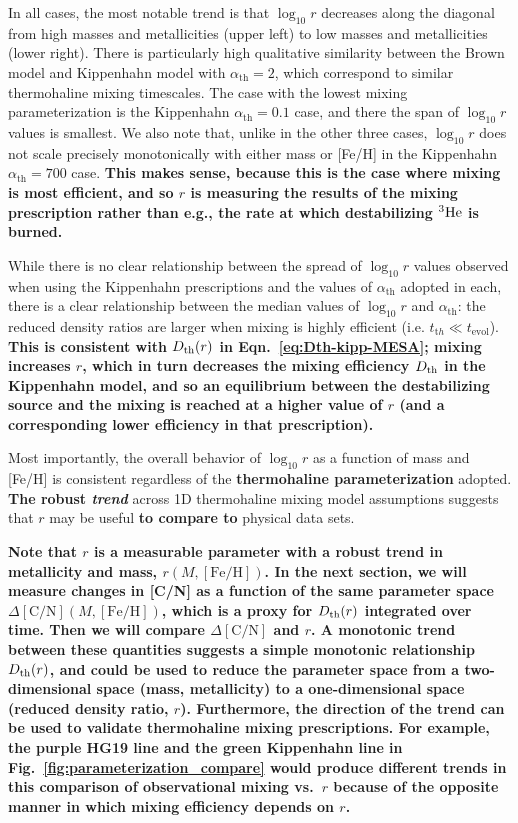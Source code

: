 In all cases, the most notable trend is that $\log_{10} r$ decreases along the diagonal from high masses and metallicities (upper left) to low masses and metallicities (lower right). There is particularly high qualitative similarity between the Brown model and Kippenhahn model with $\alpha_{\text{th}} = 2$, which correspond to similar thermohaline mixing timescales. The case with the lowest mixing parameterization is the Kippenhahn $\alpha_{\text{th}} = 0.1$ case, and there the span of $\log_{10} r$ values is smallest. We also note that, unlike in the other three cases, $\log_{10} r$ does not scale precisely monotonically with either mass or [Fe/H] in the Kippenhahn $\alpha_{\text{th}} = 700$ case. \textbf{This makes sense, because this is the case where mixing is most efficient, and so $r$ is measuring the results of the mixing prescription rather than e.g., the rate at which destabilizing $^{3}\rm{He}$ is burned.} 

While there is no clear relationship between the spread of $\log_{10} r$ values observed when using the Kippenhahn prescriptions and the values of $\alpha_{\text{th}}$ adopted in each, there is a clear relationship between the median values of $\log_{10} r$ and $\alpha_{\text{th}}$: the reduced density ratios are larger when mixing is highly efficient (i.e. $t_{\mathrm th}\ll t_{\text{evol}}$). 
\textbf{This is consistent with $D_\mathrm{th}(r)$ in Eqn.~\ref{eq:Dth-kipp-MESA}; mixing increases $r$, which in turn decreases the mixing efficiency $D_\mathrm{th}$ in the Kippenhahn model, and so an equilibrium between the destabilizing source and the mixing is reached at a higher value of $r$ (and a corresponding lower efficiency in that prescription).}

Most importantly, the overall behavior of $\log_{10} r$ as a function of mass and [Fe/H] is consistent regardless of the \textbf{thermohaline parameterization} adopted.
\textbf{The robust \emph{trend}} across 1D thermohaline mixing model assumptions suggests that $r$ may be useful \textbf{to compare to} physical data sets.

\textbf{Note that $r$ is a measurable parameter with a robust trend in metallicity and mass, $r(M, [\mathrm{Fe/H}])$. 
In the next section, we will measure changes in [C/N] as a function of the same parameter space $\Delta [\mathrm{C/N}](M, [\mathrm{Fe/H}])$, which is a proxy for $D_\mathrm{th}(r)$ integrated over time.
Then we will compare $\Delta [\mathrm{C/N}]$ and $r$.
A monotonic trend between these quantities suggests a simple monotonic relationship $D_\mathrm{th}(r)$, and could be used to reduce the parameter space from a two-dimensional space (mass, metallicity) to a one-dimensional space (reduced density ratio, $r$).
Furthermore, the direction of the trend can be used to validate thermohaline mixing prescriptions.
For example, the purple HG19 line and the green Kippenhahn line in Fig.~\ref{fig:parameterization_compare} would produce different trends in this comparison of observational mixing vs.~$r$ because of the opposite manner in which mixing efficiency depends on $r$.}

